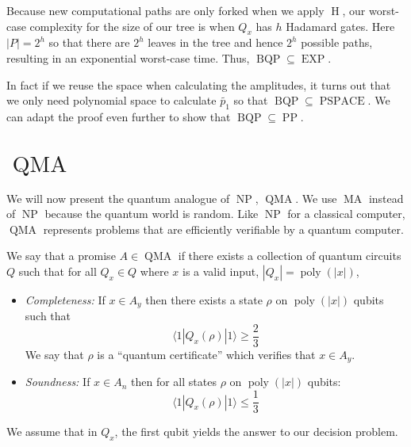 \documentclass[11pt]{article}
\newcommand{\abs}[1]{\left\lvert #1 \right\rvert}
\newcommand{\h}{\operatorname{H}}
\newcommand{\poly}{\operatorname{poly}}
\newcommand{\bqp}{\operatorname{BQP}}
\newcommand{\np}{\operatorname{NP}}
\newcommand{\pspace}{\operatorname{PSPACE}}
\renewcommand{\exp}{\operatorname{EXP}}
\newcommand{\pp}{\operatorname{PP}}
\newcommand{\qma}{\operatorname{QMA}}
\newcommand{\ma}{\operatorname{MA}}
\newcommand{\dbret}[3]{\langle{#1}|{#2}|{#3}\rangle}
\def\fill{   \hfill}
\begin{document}
\fill

\noindent Because new computational paths are only forked when we apply $\h$, our worst-case complexity for the size of our tree is when $Q_x$ has $h$ Hadamard gates. Here $|P| = 2^h$ so that there are $2^h$ leaves in the tree and hence $2^h$ possible paths, resulting in an exponential worst-case time. Thus, $\bqp \subseteq \exp$.

\fill

\noindent In fact if we reuse the space when calculating the amplitudes, it turns out that we only need polynomial space to calculate $\widetilde{p_1}$ so that $\bqp \subseteq \pspace$. We can adapt the proof even further to show that $\bqp \subseteq \pp$.

\section{$\qma$}
We will now present the quantum analogue of $\np$, $\qma$. We use $\ma$ instead of $\np$ because the quantum world is random. Like $\np$ for a classical computer, $\qma$ represents problems that are efficiently verifiable by a quantum computer.

\fill

\noindent We say that a promise $A \in \qma$ if there exists a collection of quantum circuits $Q$ such that for all $Q_x \in Q$ where $x$ is a valid input, $\abs{Q_x} = \poly(\abs{x})$,
\begin{itemize}
\item \emph{Completeness:} If $x \in A_y$ then there exists a state $\rho$ on $\poly(\abs{x})$ qubits such that
\begin{equation*}
\dbret{1}{Q_x(\rho)}{1} \geq \frac{2}{3}
\end{equation*}
We say that $\rho$ is a ``quantum certificate'' which verifies that $x \in A_y$.

\item \emph{Soundness:} If $x \in A_n$ then for all states $\rho$ on $\poly(\abs{x})$ qubits:
\begin{equation*}
\dbret{1}{Q_x(\rho)}{1} \leq \frac{1}{3}
\end{equation*}
\end{itemize}
We assume that in $Q_x$, the first qubit yields the answer to our decision problem.

\fill
\end{document}
